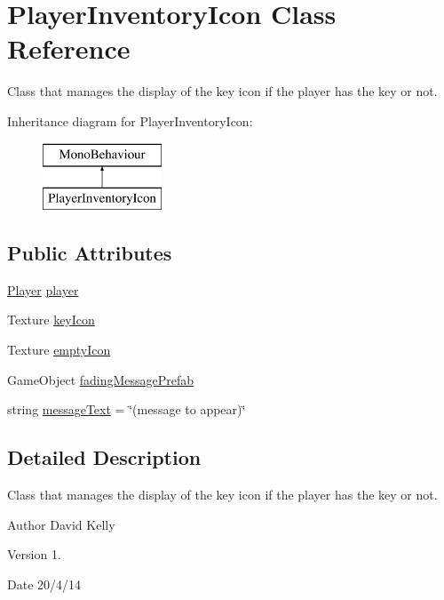 \hypertarget{class_player_inventory_icon}{\section{Player\-Inventory\-Icon Class Reference}
\label{class_player_inventory_icon}
}


Class that manages the display of the key icon if the player has the key or not.  


Inheritance diagram for Player\-Inventory\-Icon\-:\begin{figure}[H]
\begin{center}
\leavevmode
\includegraphics[height=2.000000cm]{class_player_inventory_icon}
\end{center}
\end{figure}
\subsection*{Public Attributes}
\begin{DoxyCompactItemize}
\item 
\hyperlink{class_player}{Player} \hyperlink{class_player_inventory_icon_af275fab92eb9bacfad048d1506dbd128}{player}
\item 
Texture \hyperlink{class_player_inventory_icon_a77a36854eb69ad8e1065b3020389cde0}{key\-Icon}
\item 
Texture \hyperlink{class_player_inventory_icon_adc17dc396f9f6cc8f57ecad911b68485}{empty\-Icon}
\item 
Game\-Object \hyperlink{class_player_inventory_icon_a860fe9f495c97467135ca7eaf51211d9}{fading\-Message\-Prefab}
\item 
string \hyperlink{class_player_inventory_icon_a1cfc870c87a3efae9dd66089cadc0485}{message\-Text} = \char`\"{}(message to appear)\char`\"{}
\end{DoxyCompactItemize}


\subsection{Detailed Description}
Class that manages the display of the key icon if the player has the key or not. 

\begin{DoxyAuthor}{Author}
David Kelly 
\end{DoxyAuthor}
\begin{DoxyVersion}{Version}
1. 
\end{DoxyVersion}
\begin{DoxyDate}{Date}
20/4/14 
\end{DoxyDate}


